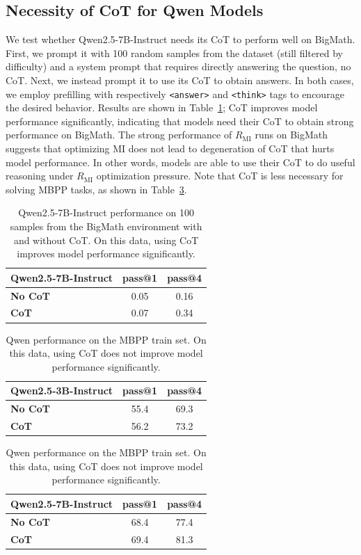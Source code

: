\documentclass{article}
\theoremstyle{plain}
\newcommand{\MIR}{R_{\mathrm{MI}}}
\begin{document}
\subsection{Necessity of CoT for Qwen Models}
We test whether Qwen2.5-7B-Instruct needs its CoT to perform well on BigMath. First, we prompt it with 100 random samples from the dataset (still filtered by difficulty) and a system prompt that requires directly answering the question, no CoT. Next, we instead prompt it to use its CoT to obtain answers. In both cases, we employ prefilling with respectively \texttt{<answer>} and \texttt{<think>} tags to encourage the desired behavior. Results are shown in Table~\ref{tab:bigmath_cot_necessity}; CoT improves model performance significantly, indicating that models need their CoT to obtain strong performance on BigMath. The strong performance of $\MIR$ runs on BigMath suggests that optimizing MI does not lead to degeneration of CoT that hurts model performance. In other words, models are able to use their CoT to do useful reasoning under $\MIR$ optimization pressure. Note that CoT is less necessary for solving MBPP tasks, as shown in Table~\ref{tab:mbpp_cot_necessity}.
\color{black}

\begin{table}[h]
\centering
\caption{Qwen2.5-7B-Instruct performance on 100 samples from the BigMath environment with and without CoT. On this data, using CoT improves model performance significantly.}
\label{tab:bigmath_cot_necessity}
\centering
\begin{tabular}{lcc}
\toprule
Qwen2.5-7B-Instruct & \textbf{pass@1} & \textbf{pass@4} \\
 \midrule
\textbf{No CoT} & 0.05 & 0.16 \\
\textbf{CoT} & 0.07 & 0.34 \\
\bottomrule
\end{tabular}
\end{table}

\begin{table}[h]
\centering
\caption{Qwen performance on the MBPP train set. On this data, using CoT does not improve model performance significantly.}
\label{tab:mbpp_cot_necessity}
\begin{tabular}{lcc}
    \toprule
    Qwen2.5-3B-Instruct & \textbf{pass@1} & \textbf{pass@4} \\ 
    \midrule
    \textbf{No CoT} & 55.4 & 69.3 \\ 
    \textbf{CoT} & 56.2 & 73.2 \\
    \bottomrule
\end{tabular}
\qquad
\begin{tabular}{lcc}
    \toprule
    Qwen2.5-7B-Instruct & \textbf{pass@1} & \textbf{pass@4} \\ 
    \midrule
    \textbf{No CoT} & 68.4 & 77.4 \\ 
    \textbf{CoT} & 69.4 & 81.3 \\
    \bottomrule
\end{tabular}
\end{table}
\end{document}
